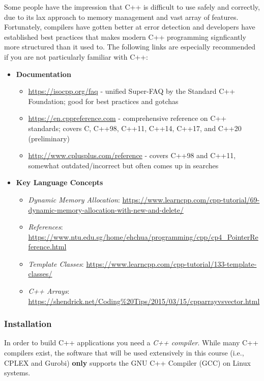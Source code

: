 \documentclass[12pt]{article}
\begin{document}
Some people have the impression that C++ is difficult to use safely and correctly, due to its lax approach to memory management and vast array of features.
Fortunately, compilers have gotten better at error detection and developers have established best practices that makes modern C++ programming signficantly more structured than it used to.
The following links are especially recommended if you are not particularly familiar with C++:
\begin{itemize}
    \item \textbf{Documentation}
        \begin{itemize}
            \item \url{https://isocpp.org/faq} - unified Super-FAQ by the Standard C++ Foundation; good for best practices and gotchas
            \item \url{https://en.cppreference.com} - comprehensive reference on C++ standards; covers C, C++98, C++11, C++14, C++17, and C++20 (preliminary)
            \item \url{http://www.cplusplus.com/reference} - covers C++98 and C++11, somewhat outdated/incorrect but often comes up in searches
        \end{itemize}
    \item \textbf{Key Language Concepts}
        \begin{itemize}
            \item \textit{Dynamic Memory Allocation}: \url{https://www.learncpp.com/cpp-tutorial/69-dynamic-memory-allocation-with-new-and-delete/}
            \item \textit{References}: \url{https://www.ntu.edu.sg/home/ehchua/programming/cpp/cp4_PointerReference.html}
            \item \textit{Template Classes}: \url{https://www.learncpp.com/cpp-tutorial/133-template-classes/}
            \item \textit{C++ Arrays}: \url{https://shendrick.net/Coding%20Tips/2015/03/15/cpparrayvsvector.html}
        \end{itemize}
\end{itemize}

\subsubsection{Installation}
In order to build C++ applications you need a \emph{C++ compiler}. 
While many C++ compilers exist, the software that will be used extensively in this course (i.e., CPLEX and Gurobi) \textbf{only} supports the GNU C++ Compiler (GCC) on Linux systems.
\end{document}

